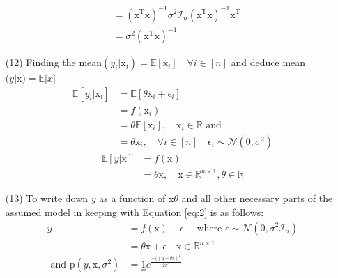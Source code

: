 \documentclass[12pt,a4paper]{article}
\begin{document}
\begin{enumerate}
\begin{align*}
							&=  (\mathrm{x}^{\text{T} }\mathrm{x})^{-1}  \sigma^2 \mathcal{I}_n  (\mathrm{x}^{\text{T} }\mathrm{x})^{-1}  \mathrm{x}^{\text{T} }\\
							&=  \sigma^2 (\mathrm{x}^{\text{T} }\mathrm{x})^{-1}
				\end{align*}
		\item[(12)] Finding the mean$(y_i|\mathrm{x}_i)  = \mathbb{E}[\mathrm{x}_i] \quad  \forall i \in [n]$ and deduce mean$(y|\mathrm{x}) =\mathbb{E}|x]$
		\begin{align*}
				\mathbb{E}[y_i | \mathrm{x}_i] &=  \mathbb{E}[\theta  \mathrm{x}_i  + \epsilon_i]  \\
				&= f(\mathrm{x}_i)\\
					&=  \theta   \mathbb{E}[ \mathrm{x}_i] ,  \quad  \mathrm{x}_i \in \mathbb{R} \text{ and}\\
					 &=  \theta \mathrm{x}_i ,  \quad \forall i \in [n] \quad \epsilon_i  \sim \mathcal{N}(0,\sigma^2)
		\end{align*}
			\begin{align*}
					\mathbb{E}[y|\mathrm{x}] &=  f(\mathrm{x}) \\
					&=  \theta \mathrm{x} , \quad \mathrm{x} \in \mathbb{R}^{n \times 1},  \theta \in \mathbb{R}
			\end{align*}					
		
		\item[(13)] To write down $y$ as a function of $\mathrm{x}  \theta$ and all other necessary parts of the assumed model in keeping with Equation \eqref{eq:2} is as follows: 
	\begin{align*}
			y &=   f(\mathrm{x}) +  \epsilon \quad \text{ where }  \epsilon  \sim \mathcal{N}(0,\sigma^2 \mathcal{I}_n)\\
				 &=  \theta \mathrm{x} + \epsilon \quad \mathrm{x} \in \mathbb{R}^{n \times 1}\\
				 \text{ and } \mathrm{p}(y,\mathrm{x},\sigma^2)  &=  \underset{\text{=}}{1}e^{\frac{-((y -  \theta \mathrm{x})^2 }{ 2\sigma^2}}
	\end{align*}
		

\end{enumerate}
\end{document}
